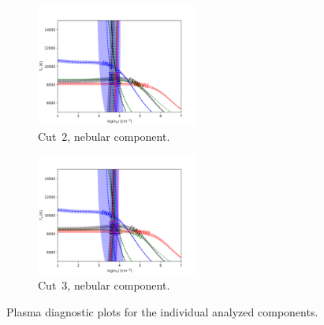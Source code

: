 \documentclass[fleqn,usenatbib]{mnras}
\begin{document}
\begin{figure}
  \begin{subfigure}{7.5cm}
   \centering\includegraphics[height=4cm,width=\columnwidth]{neb_cut2.png}
   \caption{Cut~2, nebular component.}
  \end{subfigure}
  \begin{subfigure}{7.5cm}
    \centering\includegraphics[height=4cm,width=\columnwidth]{neb_cut3.png}
    \caption{Cut~3, nebular component.}
  \end{subfigure}
  \caption{Plasma diagnostic plots for the individual analyzed components.}
\label{fig:plasma}
\end{figure}




\bsp	%
\label{lastpage}
\end{document}
